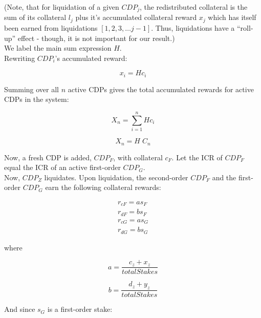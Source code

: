 \documentclass[reqno]{article}
\begin{document}
\bigskip
(Note, that for liquidation of a given $CDP_j$, the redistributed collateral is the sum of its collateral $l_j$ plus it’s accumulated collateral reward $x_j$  which has itself been earned from liquidations $[1, 2, 3, … j-1]$.  Thus, liquidations have a “roll-up” effect - though, it is not important for our result.)\\

We label the main sum expression $H$.\\

Rewriting $CDP_i$’s accumulated reward:

\begin{equation} 
    x_i=Hc_i
\end{equation}

\bigskip
Summing over all $n$ active CDPs gives the total accumulated rewards for active CDPs in the system:

\begin{equation} 
    X_n=\sum\limits^n_{i=1}Hc_i
\end{equation}

\begin{equation} 
    X_n=H \; C_n
\end{equation}

\bigskip
Now, a fresh CDP is added, $CDP_F$, with collateral $c_F$.  Let the ICR of $CDP_F$ equal the ICR of an active first-order $CDP_G$.\\

Now, $CDP_Z$ liquidates. Upon liquidation, the second-order $CDP_F$ and the first-order $CDP_G$ earn the following collateral rewards:

\begin{equation}
    \begin{split}
        r_{cF}=as_F\\
        r_{dF}=bs_F\\
        r_{cG}=as_G\\
        r_{dG}=bs_G
    \end{split}
\end{equation}

\bigskip
where

\begin{equation} 
    a=\frac{c_z+x_z}{totalStakes}
\end{equation}

\begin{equation} 
    b=\frac{d_z+y_z}{totalStakes}
\end{equation}

\bigskip
And since $s_G$ is a first-order stake:
\end{document}
